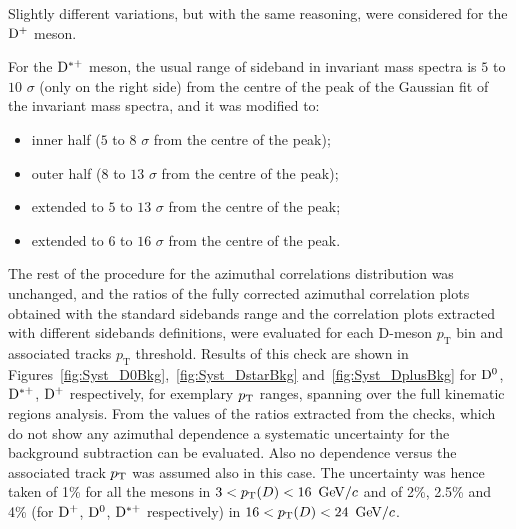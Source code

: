 Slightly different variations, but with the same reasoning, were considered for the ${\rm D^+}$ meson.

For the ${\rm D^{*+}}$ meson, the usual range of sideband in invariant mass spectra is $5$ to $10$ $\sigma$ (only on the right side) from the centre of the peak of the Gaussian fit of the invariant mass spectra,  and it was modified to:
\begin{itemize}
    \item inner half ($5$ to $8$ $\sigma$ from the centre of the peak);
    \item outer half ($8$ to $13$ $\sigma$ from the centre of the peak);
    \item extended to $5$ to $13$ $\sigma$ from the centre of the peak;
     \item extended to $6$ to $16$ $\sigma$ from the centre of the peak.
\end{itemize}

The rest of the procedure for the azimuthal correlations distribution was unchanged, and the ratios of the fully corrected azimuthal correlation plots obtained with the standard sidebands range and the correlation plots extracted with different sidebands definitions, were evaluated for each D-meson $p_\text{T}$ bin and associated tracks $p_\text{T}$ threshold. Results of this check are shown in Figures~\ref{fig:Syst_D0Bkg},~\ref{fig:Syst_DstarBkg} and~\ref{fig:Syst_DplusBkg} for ${\rm D^0}$, ${\rm D^{*+}}$, ${\rm D^+}$ respectively, for exemplary $p_{\rm T}$ ranges, spanning over the full kinematic regions analysis. From the values of the ratios extracted from the checks, which do not show any azimuthal dependence a systematic uncertainty for the background subtraction can be evaluated. Also no dependence versus the associated track $p_{\rm T}$ was assumed also in this case. The uncertainty was hence taken of 1\% for all the mesons in $3 < p_{\rm T}(D) < 16$ $\mathrm{GeV}/c$ and of 2\%, 2.5\% and 4\% (for ${\rm D^+}$, ${\rm D^0}$, ${\rm D^{*+}}$ respectively) in $16 < p_{\rm T}(D) < 24$ $\mathrm{GeV}/c$.

